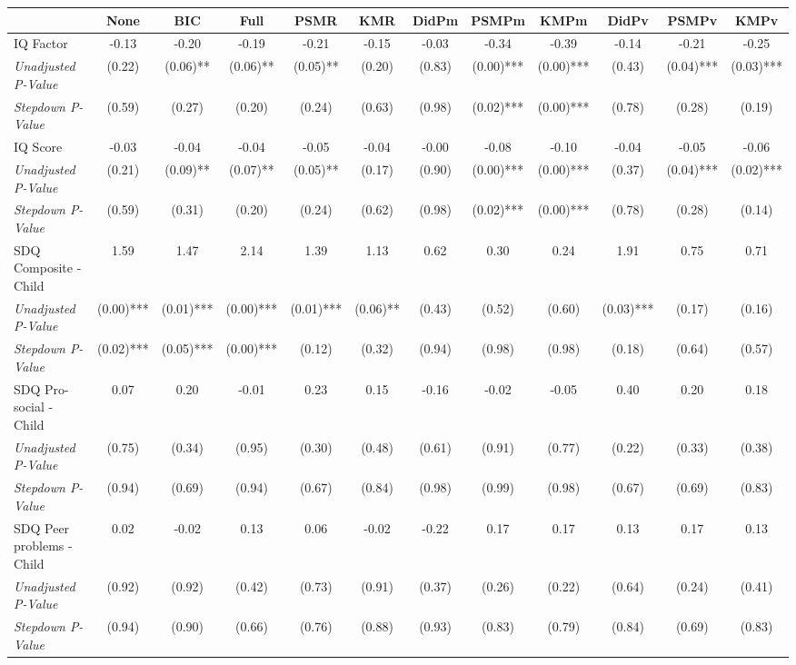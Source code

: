 \begin{tabular}{l c c c c c c c c c c c}
\toprule
 & None & BIC & Full & PSMR & KMR & DidPm & PSMPm & KMPm & DidPv & PSMPv & KMPv \\
\midrule
IQ Factor & -0.13 & -0.20 & -0.19 & -0.21 & -0.15 & -0.03 & -0.34 & -0.39 & -0.14 & -0.21 & -0.25 \\
\quad \textit{Unadjusted P-Value} & (0.22) & (0.06)** & (0.06)** & (0.05)** & (0.20) & (0.83) & (0.00)*** & (0.00)*** & (0.43) & (0.04)*** & (0.03)*** \\
\quad \textit{Stepdown P-Value} & (0.59) & (0.27) & (0.20) & (0.24) & (0.63) & (0.98) & (0.02)*** & (0.00)*** & (0.78) & (0.28) & (0.19) \\
IQ Score & -0.03 & -0.04 & -0.04 & -0.05 & -0.04 & -0.00 & -0.08 & -0.10 & -0.04 & -0.05 & -0.06 \\
\quad \textit{Unadjusted P-Value} & (0.21) & (0.09)** & (0.07)** & (0.05)** & (0.17) & (0.90) & (0.00)*** & (0.00)*** & (0.37) & (0.04)*** & (0.02)*** \\
\quad \textit{Stepdown P-Value} & (0.59) & (0.31) & (0.20) & (0.24) & (0.62) & (0.98) & (0.02)*** & (0.00)*** & (0.78) & (0.28) & (0.14) \\
SDQ Composite - Child & 1.59 & 1.47 & 2.14 & 1.39 & 1.13 & 0.62 & 0.30 & 0.24 & 1.91 & 0.75 & 0.71 \\
\quad \textit{Unadjusted P-Value} & (0.00)*** & (0.01)*** & (0.00)*** & (0.01)*** & (0.06)** & (0.43) & (0.52) & (0.60) & (0.03)*** & (0.17) & (0.16) \\
\quad \textit{Stepdown P-Value} & (0.02)*** & (0.05)*** & (0.00)*** & (0.12) & (0.32) & (0.94) & (0.98) & (0.98) & (0.18) & (0.64) & (0.57) \\
SDQ Pro-social - Child & 0.07 & 0.20 & -0.01 & 0.23 & 0.15 & -0.16 & -0.02 & -0.05 & 0.40 & 0.20 & 0.18 \\
\quad \textit{Unadjusted P-Value} & (0.75) & (0.34) & (0.95) & (0.30) & (0.48) & (0.61) & (0.91) & (0.77) & (0.22) & (0.33) & (0.38) \\
\quad \textit{Stepdown P-Value} & (0.94) & (0.69) & (0.94) & (0.67) & (0.84) & (0.98) & (0.99) & (0.98) & (0.67) & (0.69) & (0.83) \\
SDQ Peer problems - Child & 0.02 & -0.02 & 0.13 & 0.06 & -0.02 & -0.22 & 0.17 & 0.17 & 0.13 & 0.17 & 0.13 \\
\quad \textit{Unadjusted P-Value} & (0.92) & (0.92) & (0.42) & (0.73) & (0.91) & (0.37) & (0.26) & (0.22) & (0.64) & (0.24) & (0.41) \\
\quad \textit{Stepdown P-Value} & (0.94) & (0.90) & (0.66) & (0.76) & (0.88) & (0.93) & (0.83) & (0.79) & (0.84) & (0.69) & (0.83) \\

\end{tabular}
